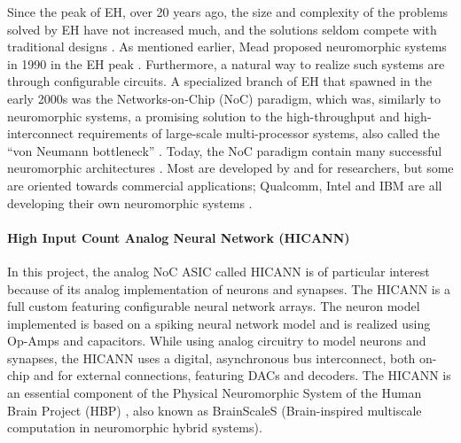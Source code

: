 Since the peak of EH, over 20 years ago, the size and complexity of the problems solved by EH have not increased much, and the solutions seldom compete with traditional designs \cite{haddow_challenges_2011}.
As mentioned earlier, Mead proposed neuromorphic systems in 1990 in the EH peak \cite{mead_neuromorphic_1990}.
Furthermore, a natural way to realize such systems are through configurable circuits.
A specialized branch of EH that spawned in the early 2000s was the Networks-on-Chip (NoC) paradigm,
which was, similarly to neuromorphic systems, a promising solution to the high-throughput and high-interconnect requirements of large-scale multi-processor systems, also called the  ``von Neumann bottleneck'' \cite{benini_networks_2002}\cite{trefzer_evolvable_2015}\cite{mead_neuromorphic_1990}.
Today, the NoC paradigm contain many successful neuromorphic architectures \cite{trefzer_evolvable_2015}.
Most are developed by and for researchers, but some are oriented towards commercial applications;
Qualcomm, Intel and IBM are all developing their own neuromorphic systems \cite{meier_mixed-signal_2015}\cite{davies_loihi_2018}\cite{debole_truenorth_2019}\cite{trefzer_evolvable_2015}.

\paragraph{High Input Count Analog Neural Network (HICANN)} \label{sect:hicann}
In this project, the analog NoC ASIC called HICANN is of particular interest\cite{schemmel_wafer-scale_2008} because of its analog implementation of neurons and synapses.
 The HICANN is a full custom featuring configurable neural network arrays.
The neuron model implemented is based on a spiking neural network model and is realized using Op-Amps and capacitors.
While using analog circuitry to model neurons and synapses, the HICANN uses a digital, asynchronous bus interconnect, both on-chip and for external connections, featuring DACs and decoders.
\cite{haddow_challenges_2011}\cite{trefzer_evolvable_2015}
The HICANN is an essential component of the Physical Neuromorphic System of the Human Brain Project (HBP) \cite{markram_introducing_2011}, also known as BrainScaleS (Brain-inspired multiscale computation in neuromorphic hybrid systems)\cite{meier_mixed-signal_2015}.


















